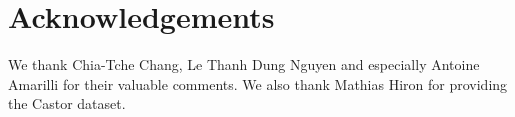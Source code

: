 \documentclass{edm_template}
\begin{document}



\section{Acknowledgements}

We thank Chia-Tche Chang, Le Thanh Dung Nguyen and especially Antoine Amarilli for their valuable comments. We also thank Mathias Hiron for providing the Castor dataset.

%

%
%
\end{document}
